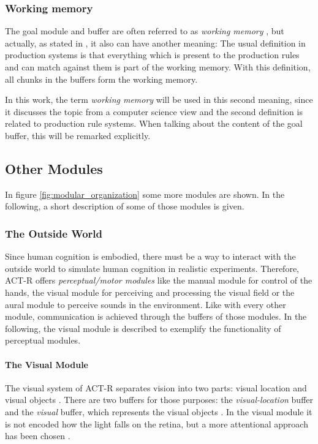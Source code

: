 \subsubsection{Working memory}

The goal module and buffer are often referred to as \emph{working memory} \cite[1041]{anderson_integrated_2004}, but actually, as stated in \cite{anderson_working_1996}, it also can have another meaning: The usual definition in production systems is that everything which is present to the production rules and can match against them is part of the working memory. With this definition, all chunks in the buffers form the working memory.

In this work, the term \emph{working memory} will be used in this second meaning, since it discusses the topic from a computer science view and the second definition is related to production rule systems. When talking about the content of the goal buffer, this will be remarked explicitly.

\subsection{Other Modules}

In figure \ref{fig:modular_organization} some more modules are shown. In the following, a short description of some of those modules is given.

\subsubsection{The Outside World}

Since human cognition is embodied, there must be a way to interact with the outside world to simulate human cognition in realistic experiments. Therefore, ACT-R offers \emph{perceptual/motor modules} like the manual module for control of the hands, the visual module for perceiving and processing the visual field or the aural module to perceive sounds in the environment. Like with every other module, communication is achieved through the buffers of those modules. In the following, the visual module is described to exemplify the functionality of perceptual modules.

\paragraph{The Visual Module} The visual system of ACT-R separates vision into two parts: visual location and visual objects \cite[p. 1039]{anderson_integrated_2004}. There are two buffers for those purposes: the \emph{visual-location} buffer and the \emph{visual} buffer, which represents the visual objects \cite[unit~2]{actr_tutorial}. In the visual module it is not encoded how the light falls on the retina, but a more attentional approach has been chosen \cite[p. 1039]{anderson_integrated_2004}. 


